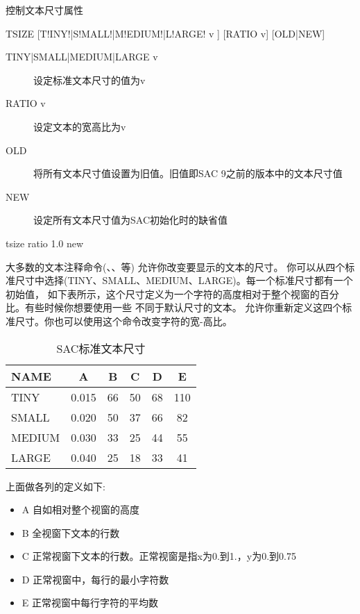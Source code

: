 \label{cmd:tsize}

控制文本尺寸属性

\begin{SACSTX}
TSIZE [T!INY!|S!MALL!|M!EDIUM!|L!ARGE! v ] [RATIO v] [OLD|NEW]
\end{SACSTX}

\begin{description}
\item [TINY|SMALL|MEDIUM|LARGE v] 设定标准文本尺寸的值为v
\item [RATIO v] 设定文本的宽高比为v
\item [OLD] 将所有文本尺寸值设置为旧值。旧值即SAC 9之前的版本中的文本尺寸值
\item [NEW] 设定所有文本尺寸值为SAC初始化时的缺省值
\end{description}

\begin{SACDFT}
tsize ratio 1.0 new
\end{SACDFT}

大多数的文本注释命令(、、等)
允许你改变要显示的文本的尺寸。
你可以从四个标准尺寸中选择(TINY、SMALL、MEDIUM、LARGE)。每一个标准尺寸都有一个初始值，
如下表所示，这个尺寸定义为一个字符的高度相对于整个视窗的百分比。有些时候你想要使用一些
不同于默认尺寸的文本。 允许你重新定义这四个标准尺寸。你也可以使用这个命令改变字符的宽-高比。
\begin{table}[!ht]
\centering
\caption{SAC标准文本尺寸}
\begin{tabular}{lccccc}
\toprule
NAME	&	A	&	B	&	C	&	D	&	E	\\
\midrule
TINY 	& 0.015 &   66 	&  50  	&	68  &	110	\\
SMALL	& 0.020 &	50  &  37  	&	66  &	82	\\
MEDIUM  & 0.030 &	33  &  25  	&	44  &	55	\\
LARGE	& 0.040 &	25  &  18  	&	33  &	41	\\
\bottomrule
\end{tabular}
\end{table}

上面做各列的定义如下:
\begin{itemize}
\item A 自如相对整个视窗的高度
\item B 全视窗下文本的行数
\item C 正常视窗下文本的行数。正常视窗是指x为0.到1.，y为0.到0.75
\item D 正常视窗中，每行的最小字符数
\item E 正常视窗中每行字符的平均数
\end{itemize}

